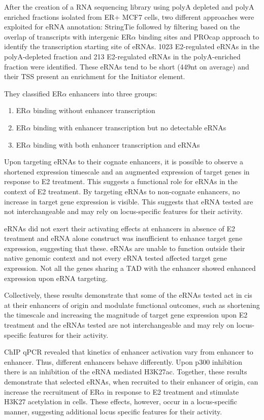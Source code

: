 After the creation of a RNA sequencing library using polyA depleted and polyA enriched fractions
isolated from ER+ MCF7 cells, two different approaches were exploited for eRNA annotation: StringTie followed by filtering based on the overlap of transcripts with intergenic ER$\alpha$ binding sites and PROcap approach to identify the transcription starting site of eRNAs.
1023 E2-regulated eRNAs in the polyA-depleted fraction and 213 E2-regulated
eRNAs in the polyA-enriched fraction were identified.
These eRNAs tend to be short (449nt on average) and their TSS present an enrichment for the Initiator element.

They classified ER$\alpha$ enhancers into three groups:
\begin{enumerate}
\tightlist
\item ER$\alpha$ binding without enhancer transcription
\item ER$\alpha$ binding with enhancer transcription but
no detectable eRNAs
\item ER$\alpha$ binding with both enhancer transcription
and eRNAs
\end{enumerate}

Upon targeting eRNAs to their cognate
enhancers, it is possible to observe a
shortened expression timescale and an
augmented expression of target genes in
response to E2 treatment.
This suggests a functional role for eRNAs in the context of E2 treatment.
By targeting eRNAs to non-cognate enhancers, no
increase in target gene expression is visible.
This suggests that eRNA tested are not
interchangeable and may rely on locus-specific features for their activity.

eRNAs did not exert their activating effects at enhancers in absence of E2 treatment and eRNA alone construct was insufficient to enhance target gene expression, suggesting that these.
eRNAs are unable to function outside their native genomic context and not every eRNA tested affected target gene expression.
Not all the genes sharing a TAD with the enhancer showed enhanced expression upon eRNA
targeting.

Collectively, these results demonstrate that some of the eRNAs tested act in cis at their enhancers of origin and
modulate functional outcomes, such as shortening the timescale
and increasing the magnitude of target gene expression upon E2
treatment and the eRNAs tested are not interchangeable and may rely on locus-
specific features for their activity.

ChIP qPCR revealed that kinetics of enhancer
activation vary from enhancer to
enhancer. Thus, different enhancers
behave differently. Upon p300 inhibition there is an inhibition of the eRNA mediated H3K27ac.
Together, these results demonstrate that selected eRNAs, when
recruited to their enhancer of origin, can increase the recruitment of
ER$\alpha$ in response to E2 treatment and stimulate H3K27 acetylation in
cells. These effects, however, occur in a locus-specific manner,
suggesting additional locus specific features for their activity.


